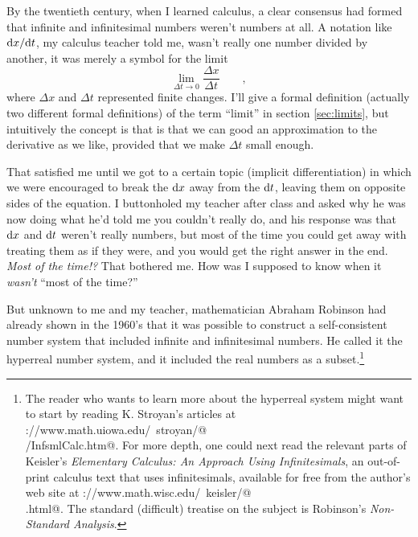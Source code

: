 By the twentieth century, when I learned calculus, a clear consensus had formed that infinite and infinitesimal
numbers weren't numbers at all. A notation like $\textup{d} x/\textup{d} t$, my calculus teacher told me, wasn't really
one number divided by another, it was merely a symbol for the limit
\begin{equation*}
\lim_{\Delta t\rightarrow 0} \frac{\Delta x}{\Delta t} \qquad ,
\end{equation*}
where $\Delta x$ and $\Delta t$ represented finite changes. I'll give a formal definition (actually two different formal
definitions) of the term ``limit'' in section \ref{sec:limits}, but intuitively the concept is that is that we can good
an approximation to the derivative as we like, provided that we make $\Delta t$ small enough.

That satisfied me until we got to a certain topic
(implicit differentiation) in which we were encouraged to break the $\textup{d} x$ away from the $\textup{d} t$, leaving them on
opposite sides of the equation. I buttonholed my teacher after class and asked why he was now doing what he'd
told me you couldn't really do, and his response was that $\textup{d} x$ and $\textup{d} t$ weren't really numbers,
but most of the time you could get away with treating them as if they were, and you would get the right
answer in the end. \emph{Most of the time!?} That bothered me. How was I supposed to know when it \emph{wasn't}
``most of the time?''


But unknown to me and my teacher, mathematician Abraham Robinson
had already shown in the 1960's that it
was possible to construct a self-consistent number system that included infinite and infinitesimal numbers.
He called it the hyperreal number system,
and it included the real numbers as a subset.\footnote{The reader who
wants to learn more about the hyperreal system might want to start
by reading K. Stroyan's articles at 
\verb@http://www.math.uiowa.edu/~stroyan/@\\
\verb@InfsmlCalculus/InfsmlCalc.htm@.
For more depth, one could next read the relevant parts of Keisler's
\emph{Elementary Calculus: An Approach Using Infinitesimals}, an out-of-print calculus text that uses infinitesimals,
available for free from the author's web site at
\verb@http://www.math.wisc.edu/~keisler/@\\
\verb@calc.html@. The standard (difficult) treatise on the subject is Robinson's
\emph{Non-Standard Analysis}.}

